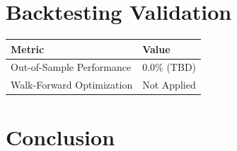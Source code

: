 \documentclass{article}
\begin{document}
\section{Backtesting Validation}
\begin{tabular}{ll}
    \textbf{Metric} & \textbf{Value} \\
    \hline
    Out-of-Sample Performance & 0.0\% (TBD) \\
    Walk-Forward Optimization & Not Applied \\
\end{tabular}

\section{Conclusion}
\lipsum[1-2] %
\end{document}
